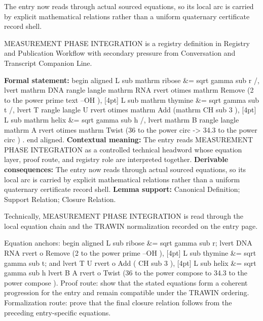 The entry now reads through actual sourced equations, so its local arc is carried by explicit mathematical relations rather than a uniform quaternary certificate record shell.
\clearpage


\begingroup\small
{}
MEASUREMENT PHASE INTEGRATION is a registry definition in Registry and Publication Workflow with secondary pressure from Conversation and Transcript Companion Line.

\begingroup\footnotesize\setlength{\emergencystretch}{3em}\sloppy
\textbf{Formal statement:} begin aligned L sub mathrm ribose \&= sqrt gamma sub r /, lvert mathrm DNA rangle langle mathrm RNA rvert otimes mathrm Remove (2 to the power prime text --OH ), [4pt] L sub mathrm thymine \&= sqrt gamma sub t /, lvert T rangle langle U rvert otimes mathrm Add (mathrm CH sub 3 ), [4pt] L sub mathrm helix \&= sqrt gamma sub h /, lvert mathrm B rangle langle mathrm A rvert otimes mathrm Twist (36 to the power circ -> 34.3 to the power circ ) . end aligned. \textbf{Contextual meaning:} The entry reads MEASUREMENT PHASE INTEGRATION as a controlled technical headword whose equation layer, proof route, and registry role are interpreted together. \textbf{Derivable consequences:} The entry now reads through actual sourced equations, so its local arc is carried by explicit mathematical relations rather than a uniform quaternary certificate record shell. \textbf{Lemma support:} Canonical Definition; Support Relation; Closure Relation.\par
\endgroup

Technically, MEASUREMENT PHASE INTEGRATION is read through the local equation chain and the TRAWIN normalization recorded on the entry page.

Equation anchors: begin aligned L sub ribose \&= sqrt gamma sub r; lvert DNA RNA rvert o Remove (2 to the power prime --OH ), [4pt] L sub thymine \&= sqrt gamma sub t; and lvert T U rvert o Add ( CH sub 3 ), [4pt] L sub helix \&= sqrt gamma sub h lvert B A rvert o Twist (36 to the power compose to 34.3 to the power compose ). Proof route: show that the stated equations form a coherent progression for the entry and remain compatible under the TRAWIN ordering. Formalization route: prove that the final closure relation follows from the preceding entry-specific equations.

